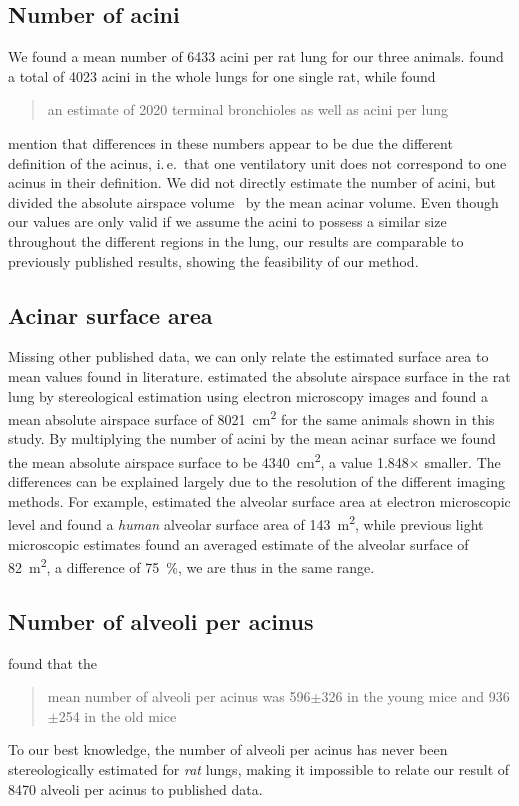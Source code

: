 \documentclass[a4paper,DIVcalc,abstract,english]{scrartcl}
\newcommand{\ie}{i.\,e.\ }
\newcommand{\meantotalnumberofacini}{6433}
\newcommand{\meannumberofalveoli}{8470} %
\newcommand{\meanairspacesurface}{4340} %
\newcommand{\airspacedifference}{1.848} %
\begin{document}
\subsection{Number of acini}
We found a mean number of \meantotalnumberofacini\xspace acini per rat lung for our three animals.
\citet[page 146]{Rodriguez1987} found a total of 4023 acini in the whole lungs for one single rat, while \citet{Mercer1987a} found \blockquote{an estimate of 2020 terminal bronchioles as well as acini per lung}.
\citet{Mercer1987a} mention that differences in these numbers appear to be due the different definition of the acinus, \ie that one ventilatory unit does not correspond to one acinus in their definition.
We did not directly estimate the number of acini, but divided the absolute airspace volume~\cite{Tschanz2003} by the mean acinar volume.
Even though our values are only valid if we assume the acini to possess a similar size throughout the different regions in the lung, our results are comparable to previously published results, showing the feasibility of our method.

\subsection{Acinar surface area}
Missing other published data, we can only relate the estimated surface area to mean values found in literature.
\citet{Tschanz2003} estimated the absolute airspace surface in the rat lung by stereological estimation using electron microscopy images and found a mean absolute airspace surface of \SI{8021}{\centi\metre\squared} for the same animals shown in this study.
By multiplying the number of acini by the mean acinar surface we found the mean absolute airspace surface to be \SI{\meanairspacesurface}{\centi\metre\squared}, a value \airspacedifference\(\times\) smaller.
The differences can be explained largely due to the resolution of the different imaging methods.
For example, \citet{Gehr1978} estimated the alveolar surface area at electron microscopic level and found a \emph{human} alveolar surface area of \SI{143}{\square\meter}, while previous light microscopic estimates \cite{Weibel1963,Thurlbeck1967} found an averaged estimate of the alveolar surface of \SI{82}{\square\meter}, a difference of \SI{75}{\percent}, we are thus in the same range.

\subsection{Number of alveoli per acinus}
\citet{Vasilescu2012} found that the \blockquote{mean number of alveoli per acinus was 596\(\pm\)326 in the young mice and 936\(\pm\)254 in the old mice}. To our best knowledge, the number of alveoli per acinus has never been stereologically estimated for \emph{rat} lungs, making it impossible to relate our result of \meannumberofalveoli\xspace alveoli per acinus to published data.
\end{document}
